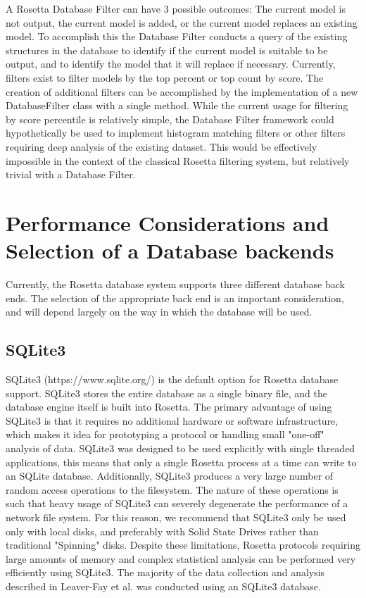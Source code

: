 A Rosetta Database Filter can have 3 possible outcomes:  The current model is not output, the current model is added, or the current model replaces an existing model.
To accomplish this the Database Filter conducts a query of the existing structures in the database  to identify if the current model is suitable to be output, and to identify the model that it will replace if necessary. 
Currently, filters exist to filter models by the top percent or top count by score.
The creation of additional filters can be accomplished by the implementation of a new DatabaseFilter class with a single method.
While the current usage for filtering by score percentile is relatively simple, the Database Filter framework could hypothetically be used to implement histogram matching filters or other filters requiring deep analysis of the existing dataset.
This would be effectively impossible in the context of the classical Rosetta filtering system, but relatively trivial with a Database Filter.

\section{Performance Considerations and Selection of a Database backends}

Currently, the Rosetta database system supports three different database back ends.
The selection of the appropriate back end is an important consideration, and will depend largely on the way in which the database will be used.

\subsection{SQLite3}
SQLite3 (https://www.sqlite.org/) is the default option for Rosetta database support.
SQLite3 stores the entire database as a single binary file, and the database engine itself is built into Rosetta.
The primary advantage of using SQLite3 is that it requires no additional hardware or software infrastructure, which makes it idea for prototyping a protocol or handling small "one-off" analysis of data.
SQLite3 was designed to be used explicitly with single threaded applications, this means that only a single Rosetta process at a time can write to an SQLite database.
Additionally, SQLite3 produces a very large number of random access operations to the filesystem.
The nature of these operations is such that heavy usage of SQLite3 can severely degenerate the performance of a network file system.
For this reason, we recommend that SQLite3 only be used only with local disks, and preferably with Solid State Drives rather than traditional "Spinning" disks.
Despite these limitations, Rosetta protocols requiring large amounts of memory and complex statistical analysis can be performed very efficiently using SQLite3.
The majority of the data collection and analysis described in Leaver-Fay et al. \citep{LeaverFay:2013fn} was conducted using an SQLite3 database.

